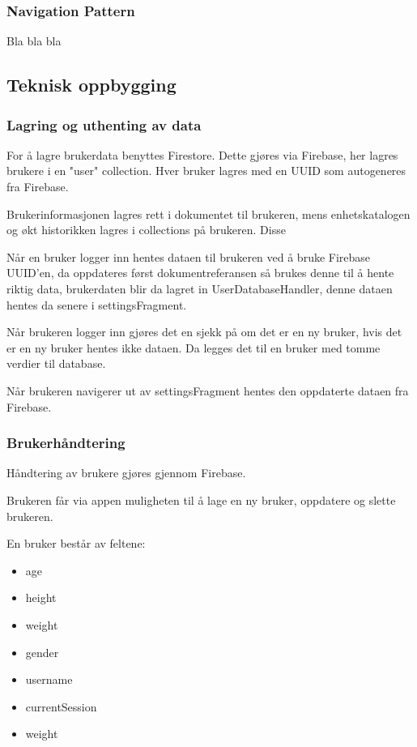\subsubsection{Navigation Pattern}
Bla bla bla

\subsection{Teknisk oppbygging}

\subsubsection{Lagring og uthenting av data}
For å lagre brukerdata benyttes Firestore. Dette gjøres via Firebase, her lagres brukere i en "user" collection. Hver bruker lagres med en UUID som autogeneres fra Firebase. 

Brukerinformasjonen lagres rett i dokumentet til brukeren, mens enhetskatalogen og økt historikken lagres i collections på brukeren. 
Disse 

Når en bruker logger inn hentes dataen til brukeren ved å bruke Firebase UUID'en, da oppdateres først dokumentreferansen så brukes denne til å hente riktig data, brukerdaten blir da lagret in UserDatabaseHandler, denne dataen hentes da senere i settingsFragment. 

Når brukeren logger inn gjøres det en sjekk på om det er en ny bruker, hvis det er en ny bruker hentes ikke dataen. 
Da legges det til en bruker med tomme verdier til database. 

Når brukeren navigerer ut av settingsFragment hentes den oppdaterte dataen fra Firebase.

\subsubsection{Brukerhåndtering}
Håndtering av brukere gjøres gjennom Firebase.

Brukeren får via appen muligheten til å lage en ny bruker, oppdatere og slette brukeren.

En bruker består av feltene:
\begin{itemize}
    \item age
    \item height
    \item weight
    \item gender
    \item username
    \item currentSession
    \item weight
\end{itemize}

